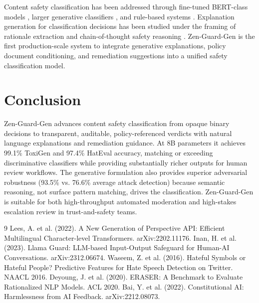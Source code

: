 \documentclass[11pt,a4paper]{article}
\begin{document}
Content safety classification has been addressed through fine-tuned BERT-class models \cite{perspective}, larger generative classifiers \cite{llmguard}, and rule-based systems \cite{cld}. Explanation generation for classification decisions has been studied under the framing of rationale extraction \cite{rationale} and chain-of-thought safety reasoning \cite{cot_safety}. Zen-Guard-Gen is the first production-scale system to integrate generative explanations, policy document conditioning, and remediation suggestions into a unified safety classification model.

\section{Conclusion}

Zen-Guard-Gen advances content safety classification from opaque binary decisions to transparent, auditable, policy-referenced verdicts with natural language explanations and remediation guidance. At 8B parameters it achieves 99.1\% ToxiGen and 97.4\% HatEval accuracy, matching or exceeding discriminative classifiers while providing substantially richer outputs for human review workflows. The generative formulation also provides superior adversarial robustness (93.5\% vs. 76.6\% average attack detection) because semantic reasoning, not surface pattern matching, drives the classification. Zen-Guard-Gen is suitable for both high-throughput automated moderation and high-stakes escalation review in trust-and-safety teams.

\begin{thebibliography}{9}
 Lees, A. et al. (2022). A New Generation of Perspective API: Efficient Multilingual Character-level Transformers. arXiv:2202.11176.
 Inan, H. et al. (2023). Llama Guard: LLM-based Input-Output Safeguard for Human-AI Conversations. arXiv:2312.06674.
 Waseem, Z. et al. (2016). Hateful Symbols or Hateful People? Predictive Features for Hate Speech Detection on Twitter. NAACL 2016.
 Deyoung, J. et al. (2020). ERASER: A Benchmark to Evaluate Rationalized NLP Models. ACL 2020.
 Bai, Y. et al. (2022). Constitutional AI: Harmlessness from AI Feedback. arXiv:2212.08073.
\end{thebibliography}
\end{document}

